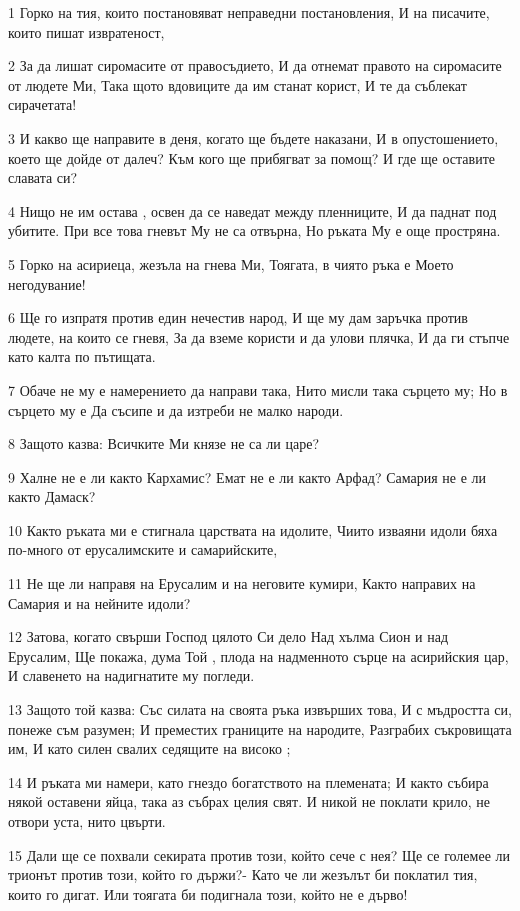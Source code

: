 \par 1 Горко на тия, които постановяват неправедни постановления, И на писачите, които пишат извратеност,
\par 2 За да лишат сиромасите от правосъдието, И да отнемат правото на сиромасите от людете Ми, Така щото вдовиците да им станат корист, И те да съблекат сирачетата!
\par 3 И какво ще направите в деня, когато ще бъдете наказани, И в опустошението, което ще дойде от далеч? Към кого ще прибягват за помощ? И где ще оставите славата си?
\par 4 Нищо не им остава , освен да се наведат между пленниците, И да паднат под убитите. При все това гневът Му не са отвърна, Но ръката Му е още простряна.
\par 5 Горко на асириеца, жезъла на гнева Ми, Тоягата, в чиято ръка е Моето негодувание!
\par 6 Ще го изпратя против един нечестив народ, И ще му дам заръчка против людете, на които се гневя, За да вземе користи и да улови плячка, И да ги стъпче като калта по пътищата.
\par 7 Обаче не му е намерението да направи така, Нито мисли така сърцето му; Но в сърцето му е Да съсипе и да изтреби не малко народи.
\par 8 Защото казва: Всичките Ми князе не са ли царе?
\par 9 Халне не е ли както Кархамис? Емат не е ли както Арфад? Самария не е ли както Дамаск?
\par 10 Както ръката ми е стигнала царствата на идолите, Чиито изваяни идоли бяха по-много от ерусалимските и самарийските,
\par 11 Не ще ли направя на Ерусалим и на неговите кумири, Както направих на Самария и на нейните идоли?
\par 12 Затова, когато свърши Господ цялото Си дело Над хълма Сион и над Ерусалим, Ще покажа, дума Той , плода на надменното сърце на асирийския цар, И славенето на надигнатите му погледи.
\par 13 Защото той казва: Със силата на своята ръка извърших това, И с мъдростта си, понеже съм разумен; И преместих границите на народите, Разграбих съкровищата им, И като силен свалих седящите на високо ;
\par 14 И ръката ми намери, като гнездо богатството на племената; И както събира някой оставени яйца, така аз събрах целия свят. И никой не поклати крило, не отвори уста, нито цвърти.
\par 15 Дали ще се похвали секирата против този, който сече с нея? Ще се големее ли трионът против този, който го държи?- Като че ли жезълът би поклатил тия, които го дигат. Или тоягата би подигнала този, който не е дърво!
